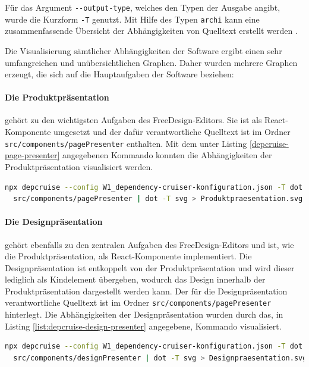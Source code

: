 Für das Argument \lstinline|--output-type|, welches den Typen der Ausgabe angibt, wurde die Kurzform  \lstinline|-T| genutzt. Mit Hilfe des Typen \lstinline|archi| kann eine zusammenfassende Übersicht der Abhängigkeiten von Quelltext erstellt werden \autocite[vgl.][]{Verweij:Options}.

Die Visualisierung sämtlicher Abhängigkeiten der Software ergibt einen sehr umfangreichen und unübersichtlichen Graphen. Daher wurden mehrere Graphen erzeugt, die sich auf die Hauptaufgaben der Software beziehen:
\paragraph{Die Produktpräsentation} gehört zu den wichtigsten Aufgaben des FreeDesign-Editors. 
Sie ist als React-Komponente umgesetzt und der dafür verantwortliche Quelltext ist im Ordner 
\lstinline|src/components/pagePresenter| enthalten. Mit dem unter Listing \ref{depcruise-page-presenter} angegebenen Kommando konnten die Abhängigkeiten der Produktpräsentation visualisiert werden. 
\begin{lstlisting}[language={sh}, label=depcruise-page-presenter, caption=Erzeugung der Visualisierung der Abhängigkeiten für die Produktpräsentation]
npx depcruise --config W1_dependency-cruiser-konfiguration.json -T dot
  src/components/pagePresenter | dot -T svg > Produktpraesentation.svg
\end{lstlisting}

\paragraph{Die Designpräsentation} gehört ebenfalls zu den zentralen Aufgaben des FreeDesign-Editors und ist, wie die Produktpräsentation, als React-Komponente implementiert. Die Designpräsentation ist entkoppelt von der Produktpräsentation und wird dieser lediglich als Kindelement übergeben, wodurch das Design innerhalb der Produktpräsentation dargestellt werden kann.
Der für die Designpräsentation verantwortliche Quelltext ist im Ordner \lstinline|src/components/pagePresenter| hinterlegt. Die Abhängigkeiten der Designpräsentation wurden durch das, in Listing \ref{list:depcruise-design-presenter} angegebene, Kommando visualisiert.
\begin{lstlisting}[language={sh}, label=list:depcruise-design-presenter, caption=Erzeugung der Visualisierung der Abhängigkeiten für die Designpräsentation]
npx depcruise --config W1_dependency-cruiser-konfiguration.json -T dot 
  src/components/designPresenter | dot -T svg > Designpraesentation.svg
\end{lstlisting}

